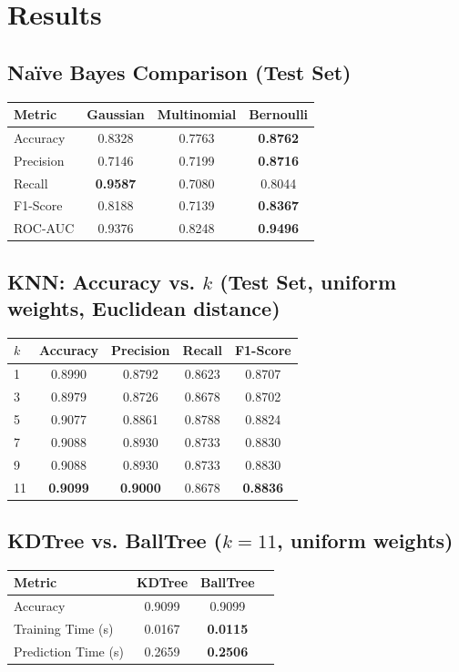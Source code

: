 \documentclass[12pt,a4paper]{article}
\begin{document}
\section{Results}

\subsection*{Na\"ive Bayes Comparison (Test Set)}
\begin{tabular}{lccc}
\toprule
Metric & Gaussian & Multinomial & Bernoulli \\
\midrule
Accuracy  & 0.8328 & 0.7763 & \textbf{0.8762} \\
Precision & 0.7146 & 0.7199 & \textbf{0.8716} \\
Recall    & \textbf{0.9587} & 0.7080 & 0.8044 \\
F1-Score  & 0.8188 & 0.7139 & \textbf{0.8367} \\
ROC-AUC   & 0.9376 & 0.8248 & \textbf{0.9496} \\
\bottomrule
\end{tabular}

\subsection*{KNN: Accuracy vs. $k$ (Test Set, uniform weights, Euclidean distance)}
\begin{tabular}{lcccc}
\toprule
$k$ & Accuracy & Precision & Recall & F1-Score \\
\midrule
1  & 0.8990 & 0.8792 & 0.8623 & 0.8707 \\
3  & 0.8979 & 0.8726 & 0.8678 & 0.8702 \\
5  & 0.9077 & 0.8861 & 0.8788 & 0.8824 \\
7  & 0.9088 & 0.8930 & 0.8733 & 0.8830 \\
9  & 0.9088 & 0.8930 & 0.8733 & 0.8830 \\
11 & \textbf{0.9099} & \textbf{0.9000} & 0.8678 & \textbf{0.8836} \\
\bottomrule
\end{tabular}

\subsection*{KDTree vs. BallTree ($k=11$, uniform weights)}
\begin{tabular}{lccc}
\toprule
Metric & KDTree & BallTree \\
\midrule
Accuracy & 0.9099 & 0.9099 \\
Training Time (s) & 0.0167 & \textbf{0.0115} \\
Prediction Time (s) & 0.2659 & \textbf{0.2506} \\
\bottomrule
\end{tabular}
\end{document}
